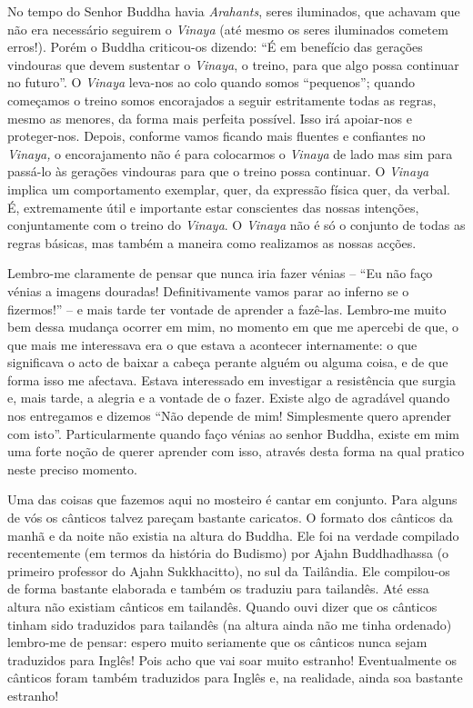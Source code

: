 No tempo do Senhor Buddha havia \emph{Arahants}, seres iluminados, que
achavam que não era necessário seguirem o \emph{Vinaya} (até mesmo os
seres iluminados cometem erros!). Porém o Buddha criticou-os dizendo:
``É em benefício das gerações vindouras que devem sustentar o
\emph{Vinaya}, o treino, para que algo possa continuar no futuro''. O
\emph{Vinaya} leva-nos ao colo quando somos ``pequenos''; quando
começamos o treino somos encorajados a seguir estritamente todas as
regras, mesmo as menores, da forma mais perfeita possível. Isso irá
apoiar-nos e proteger-nos. Depois, conforme vamos ficando mais fluentes
e confiantes no \emph{Vinaya,} o encorajamento não é para colocarmos o
\emph{Vinaya} de lado mas sim para passá-lo às gerações vindouras para
que o treino possa continuar. O \emph{Vinaya} implica um comportamento
exemplar, quer, da expressão física quer, da verbal. É, extremamente
útil e importante estar conscientes das nossas intenções, conjuntamente
com o treino do \emph{Vinaya}. O \emph{Vinaya} não é só o conjunto de
todas as regras básicas, mas também a maneira como realizamos as nossas
acções.

Lembro-me claramente de pensar que nunca iria fazer vénias -- ``Eu não
faço vénias a imagens douradas! Definitivamente vamos parar ao inferno
se o fizermos!'' -- e mais tarde ter vontade de aprender a fazê-las.
Lembro-me muito bem dessa mudança ocorrer em mim, no momento em que me
apercebi de que, o que mais me interessava era o que estava a acontecer
internamente: o que significava o acto de baixar a cabeça perante alguém
ou alguma coisa, e de que forma isso me afectava. Estava interessado em
investigar a resistência que surgia e, mais tarde, a alegria e a vontade
de o fazer. Existe algo de agradável quando nos entregamos e dizemos
``Não depende de mim! Simplesmente quero aprender com isto''.
Particularmente quando faço vénias ao senhor Buddha, existe em mim uma
forte noção de querer aprender com isso, através desta forma na qual
pratico neste preciso momento.

Uma das coisas que fazemos aqui no mosteiro é cantar em conjunto. Para
alguns de vós os cânticos talvez pareçam bastante caricatos. O formato
dos cânticos da manhã e da noite não existia na altura do Buddha. Ele
foi na verdade compilado recentemente (em termos da história do Budismo)
por Ajahn Buddhadhassa (o primeiro professor do Ajahn Sukkhacitto), no
sul da Tailândia. Ele compilou-os de forma bastante elaborada e também
os traduziu para tailandês. Até essa altura não existiam cânticos em
tailandês. Quando ouvi dizer que os cânticos tinham sido traduzidos para
tailandês (na altura ainda não me tinha ordenado) lembro-me de pensar:
espero muito seriamente que os cânticos nunca sejam traduzidos para
Inglês! Pois acho que vai soar muito estranho! Eventualmente os cânticos
foram também traduzidos para Inglês e, na realidade, ainda soa bastante
estranho!

